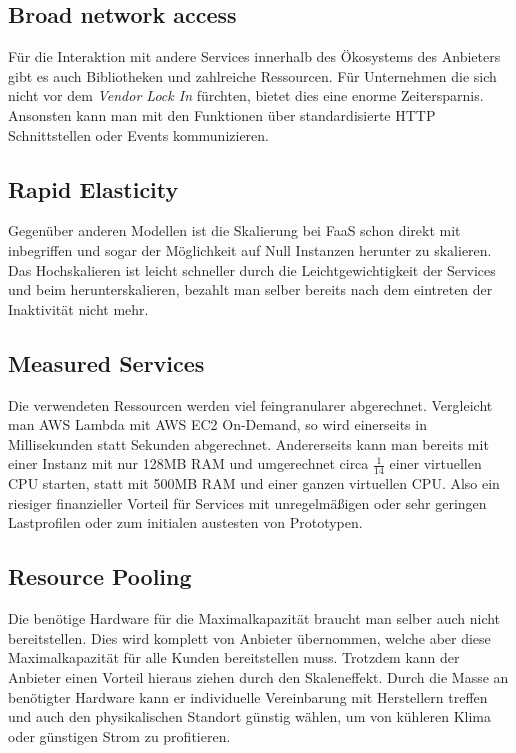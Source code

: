 \documentclass[12pt, a4paper]{article}
\begin{document}
\subsection{Broad network access}
Für die Interaktion mit andere Services innerhalb des Ökosystems des Anbieters gibt es auch Bibliotheken und zahlreiche Ressourcen.
Für Unternehmen die sich nicht vor dem \emph{Vendor Lock In} fürchten, bietet dies eine enorme Zeitersparnis.
Ansonsten kann man mit den Funktionen über standardisierte HTTP Schnittstellen oder Events kommunizieren.

\subsection{Rapid Elasticity}
Gegenüber anderen Modellen ist die Skalierung bei \ac{FaaS} schon direkt mit inbegriffen und sogar der Möglichkeit auf Null Instanzen herunter zu skalieren.
Das Hochskalieren ist leicht schneller durch die Leichtgewichtigkeit der Services und beim herunterskalieren, bezahlt man selber bereits nach dem eintreten der Inaktivität nicht mehr.

\subsection{Measured Services}
Die verwendeten Ressourcen werden viel feingranularer abgerechnet.
Vergleicht man AWS Lambda mit AWS EC2 On-Demand, so wird einerseits in Millisekunden statt Sekunden abgerechnet.
Andererseits kann man bereits mit einer Instanz mit nur 128MB RAM und umgerechnet circa \(\frac{1}{14}\) einer virtuellen CPU starten, statt mit 500MB RAM und einer ganzen virtuellen CPU.
Also ein riesiger finanzieller Vorteil für Services mit unregelmäßigen oder sehr geringen Lastprofilen oder zum initialen austesten von Prototypen.

\subsection{Resource Pooling}
Die benötige Hardware für die Maximalkapazität braucht man selber auch nicht bereitstellen.
Dies wird komplett von Anbieter übernommen, welche aber diese Maximalkapazität für alle Kunden bereitstellen muss.
Trotzdem kann der Anbieter einen Vorteil hieraus ziehen durch den Skaleneffekt.
Durch die Masse an benötigter Hardware kann er individuelle Vereinbarung mit Herstellern treffen und auch den physikalischen Standort günstig wählen, um von kühleren Klima oder günstigen Strom zu profitieren.
\end{document}
